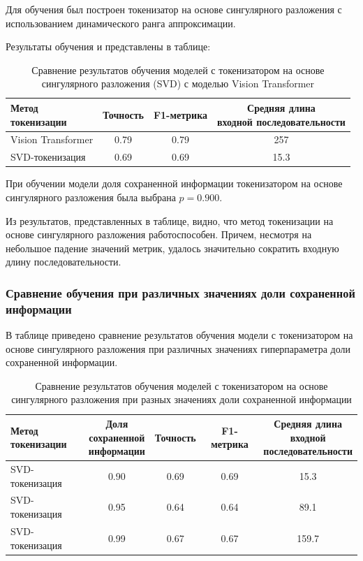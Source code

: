 \documentclass[times,specification,annotation]{itmo-student-thesis}
\begin{document}
Для обучения был построен токенизатор на основе сингулярного разложения с использованием динамического ранга аппроксимации.

Результаты обучения и представлены в таблице:

\begin{table}[H]
  \centering
  \caption{Сравнение результатов обучения моделей с токенизатором на основе сингулярного разложения (SVD) с моделью Vision Transformer}
  \label{tab:svd-tokenization}
  \begin{tabular}{|l|c|c|c|}
    \hline
    \makecell{Метод \\ токенизации} 
      & {Точность} 
      & {F1-метрика} 
      & \makecell{Средняя длина \\ входной последовательности} \\ 
    \hline
    Vision Transformer & 0.79 & 0.79 & 257 \\
    SVD-токенизация & 0.69 & 0.69 & 15.3 \\ \hline
  \end{tabular}
\end{table}

При обучении модели доля сохраненной информации токенизатором на основе сингулярного разложения была выбрана $p = 0.900$.

Из результатов, представленных в таблице, видно, что метод токенизации на основе сингулярного разложения работоспособен. Причем, несмотря на небольшое падение значений метрик, удалось значительно сократить входную длину последовательности.

\subsubsection{Сравнение обучения при различных значениях доли сохраненной информации}

В таблице приведено сравнение результатов обучения модели с токенизатором на основе сингулярного разложения при различных значениях гиперпараметра доли сохраненной информации.

\begin{table}[H]
  \centering
  \caption{Сравнение результатов обучения моделей с токенизатором на основе сингулярного разложения при разных значениях доли сохраненной информации}
  \label{tab:svd-tokenization-disp}
  \begin{tabular}{|l|c|c|c|c|}
    \hline
    \makecell{Метод \\ токенизации}
      & \makecell{Доля \\ сохраненной \\ информации}
      & {Точность} 
      & {F1-метрика} 
      & \makecell{Средняя длина \\ входной \\ последовательности} \\ 
    \hline
    SVD-токенизация & 0.90 & 0.69 & 0.69 & 15.3 \\
    SVD-токенизация & 0.95 & 0.64 & 0.64 & 89.1 \\
    SVD-токенизация & 0.99 & 0.67 & 0.67 & 159.7 \\ \hline
  \end{tabular}
\end{table}
\end{document}
